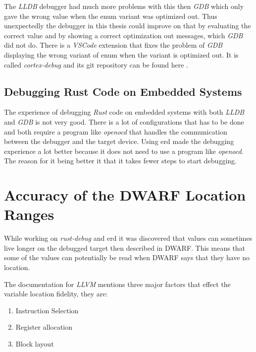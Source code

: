 The \emph{LLDB} debugger had much more problems with this then \emph{GDB} which only gave the wrong value when the enum variant was optimized out.
Thus unexpectedly the debugger in this thesis could improve on that by evaluating the correct value and by showing a correct optimization out messages, which \emph{GDB} did not do.
There is a \emph{VSCode} extension that fixes the problem of \emph{GDB} displaying the wrong variant of enum when the variant is optimized out.
It is called \emph{cortex-debug} and its git repository can be found here \cite{cortex-debug}.


\subsection{Debugging Rust Code on Embedded Systems}
The experience of debugging \emph{Rust} code on embedded systems with both \emph{LLDB} and \emph{GDB} is not very good.
There is a lot of configurations that has to be done and both require a program like \emph{openocd} that handles the communication between the debugger and the target device.
Using \gls{erd} made the debugging experience a lot better because it does not need to use a program like \emph{openocd}.
The reason for it being better it that it takes fewer steps to start debugging.


\section{Accuracy of the \gls{DWARF} Location Ranges}\label{section:loc-ranges}
While working on \emph{rust-debug} and \gls{erd} it was discovered that values can sometimes live longer on the debugged target then described in \gls{DWARF}.
This means that some of the values can potentially be read when \gls{DWARF} says that they have no location.


The documentation for \emph{LLVM} \cite{llvm-dbs} mentions three major factors that effect the variable location fidelity, they are:

\begin{enumerate}
  \item Instruction Selection
  \item Register allocation
  \item Block layout
\end{enumerate}

